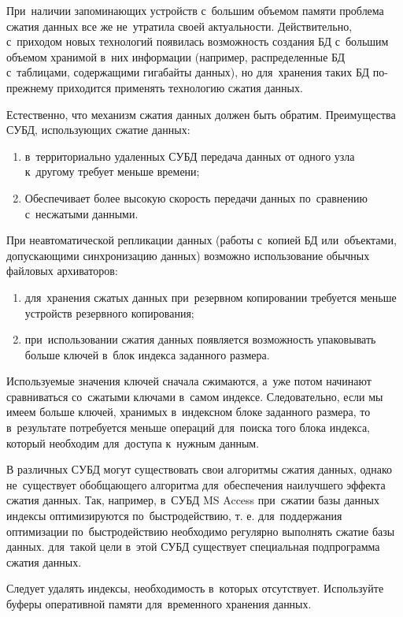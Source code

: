 \documentclass{ou}
\begin{document}
При~наличии запоминающих устройств с~большим объемом памяти проблема сжатия данных все же не~утратила своей актуальности. Действительно, с~приходом новых технологий появилась возможность создания БД с~большим объемом хранимой в~них информации (например, распределенные БД с~таблицами, содержащими гигабайты данных), но для~хранения таких БД по-прежнему приходится применять технологию сжатия данных.

Естественно, что механизм сжатия данных должен быть обратим. Преимущества СУБД, использующих сжатие данных:
\begin{enumerate}[itemindent=4em, nosep, label=\arabic*)]
\item в~территориально удаленных СУБД передача данных от одного узла к~другому требует меньше времени;
\item Обеспечивает более высокую скорость передачи данных по~сравнению с~несжатыми данными.
\end{enumerate}
При неавтоматической репликации данных (работы с~копией БД или~объектами, допускающими синхронизацию данных) возможно использование обычных файловых архиваторов:
\begin{enumerate}[itemindent=4em, nosep, label=\arabic*)]
\item для~хранения сжатых данных при~резервном копировании требуется меньше устройств резервного копирования;
\item при~использовании сжатия данных появляется возможность упаковывать больше ключей в~блок индекса заданного размера.
\end{enumerate}

Используемые значения ключей сначала сжимаются, а~уже потом начинают сравниваться со~сжатыми ключами в~самом индексе. Следовательно, если мы имеем больше ключей, хранимых в~индексном блоке заданного размера, то в~результате потребуется меньше операций для~поиска того блока индекса, который необходим для~доступа к~нужным данным.

В различных СУБД могут существовать свои алгоритмы сжатия данных, однако не~существует обобщающего алгоритма для~обеспечения наилучшего эффекта сжатия данных. Так, например, в~СУБД MS Access при~сжатии базы данных индексы оптимизируются по~быстродействию, т. е. для~поддержания оптимизации по~быстродействию необходимо регулярно выполнять сжатие базы данных. для~такой цели в~этой СУБД существует специальная подпрограмма сжатия данных.

Следует удалять индексы, необходимость в~которых отсутствует. Используйте буферы оперативной памяти для~временного хранения данных.
\end{document}
